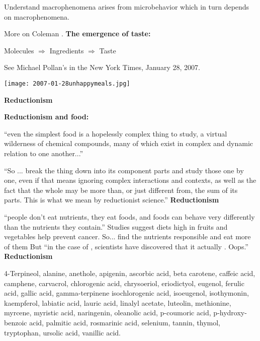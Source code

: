    
    Understand macrophenomena arises from microbehavior
    which in turn depends on macrophenomena.\cite{coleman1994a}
  
    More on Coleman 
    .
  \textbf{The emergence of taste:}
    
     
      Molecules $\Rightarrow$ Ingredients $\Rightarrow$ Taste 
     
      See Michael Pollan's
       in the New York Times, January 28, 2007.

      \medskip

      
\begin{marginfigure}[]
\texttt{[image: 2007-01-28unhappymeals.jpg]}\\
\end{marginfigure}

      {\tiny {}}
  \textbf{Reductionism}

  \textbf{Reductionism and food:}
    
%     
     
      ``even the simplest food is a
      hopelessly complex thing to study, a virtual wilderness of chemical
      compounds, many of which exist in complex and dynamic relation to one
      another...''
    
      ``So ... break the
      thing down into its component parts and study those one by one, even
      if that means ignoring complex interactions and contexts, as well as
      the fact that the whole may be more than, or just different from, the
      sum of its parts. This is what we mean by reductionist science.''
  \textbf{Reductionism}
  
   ``people don't eat nutrients, they eat foods, and foods can behave
    very differently than the nutrients they contain.''
   Studies suggest diets high in fruits and vegetables help prevent cancer.
   So...  find the nutrients responsible and eat more of them
   But ``in the case of , scientists have discovered that it
    actually . Oops.''
  \textbf{Reductionism}
    
    \textbf{}
      4-Terpineol, alanine, anethole, apigenin, ascorbic acid, beta
      carotene, caffeic acid, camphene, carvacrol, chlorogenic acid,
      chrysoeriol, eriodictyol, eugenol, ferulic acid, gallic acid,
      gamma-terpinene isochlorogenic acid, isoeugenol, isothymonin,
      kaempferol, labiatic acid, lauric acid, linalyl acetate, luteolin,
      methionine, myrcene, myristic acid, naringenin, oleanolic acid,
      p-coumoric acid, p-hydroxy-benzoic acid, palmitic acid, rosmarinic
      acid, selenium, tannin, thymol, tryptophan, ursolic acid, vanillic
      acid.
    

